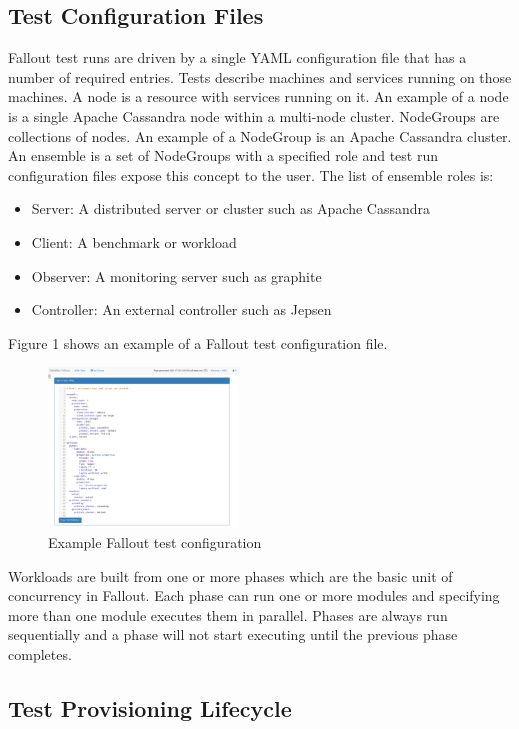 \documentclass[a4paper,fleqn]{cas-dc}
\begin{document}
\subsection{Test Configuration Files}

Fallout test runs are driven by a single YAML configuration file that has a number of required
entries. Tests describe machines and services running on those machines. A node is a resource with
services running on it. An example of a node is a single Apache Cassandra node within a multi-node
cluster. NodeGroups are collections of nodes. An example of a NodeGroup is an Apache Cassandra
cluster. An ensemble is a set of NodeGroups with a specified role and test run configuration files
expose this concept to the user. The list of ensemble roles is:

\begin{itemize}
	\item Server: A distributed server or cluster such as Apache Cassandra
	\item Client: A benchmark or workload
	\item Observer: A monitoring server such as graphite
	\item Controller: An external controller such as Jepsen
\end{itemize}

Figure 1 shows an example of a Fallout test configuration file.

\begin{figure}
	\includegraphics[width=0.45\textwidth]{new-test}
	\caption{Example Fallout test configuration}\label{Figure 1}
\end{figure}

Workloads are built from one or more phases which are the basic unit of concurrency in Fallout. Each
phase can run one or more modules and specifying more than one module executes them in parallel.
Phases are always run sequentially and a phase will not start executing until the previous phase
completes.

\subsection{Test Provisioning Lifecycle}
\end{document}
